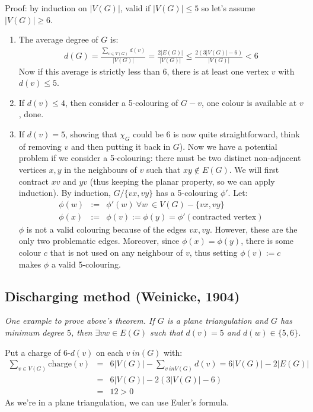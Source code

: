 		Proof: by induction on $|V(G)|$, valid if $|V(G)| \leq 5$ so let's assume $|V(G)| \geq 6$. 
		\begin{enumerate}
			\item The average degree of $G$ is:
				\begin{eqnarray}
					d(G) = \frac{\sum_{v \in V(G)} d(v)}{|V(G)|} = \frac{2 |E(G)|}{|V(G)|} \leq \frac{2 (3|V(G)| - 6)}{|V(G)|} < 6
				\end{eqnarray}
				Now if this average is strictly less than 6, there is at least one vertex $v$ with $d(v) \leq 5$.
			\item If $d(v) \leq 4$, then consider a 5-colouring of $G-v$, one colour is available at $v$, done.
			\item If $d(v) = 5$, showing that $\chi_{G}$ could be 6 is now quite straightforward, think of removing $v$ and then putting it back in $G$). Now we have a potential problem if we consider a 5-colouring: there must be two distinct non-adjacent vertices $x, y$ in the neighbours of $v$ such that $xy \notin E(G)$. We will first contract $xv$ and $yv$ (thus keeping the planar property, so we can apply induction). By induction, $G / \{ vx, vy \}$ has a 5-colouring $\phi'$. Let:
				\begin{eqnarray}
					\phi(w) &:=& \phi'(w) ~\forall w\ \in V(G) - \{ vx, vy \}\\
					\phi(x) &:=& \phi(v) := \phi(y) = \phi'(\text{contracted vertex})
				\end{eqnarray}
				$\phi$ is not a valid colouring because of the edges $vx, vy$. However, these are the only two problematic edges. Moreover, since $\phi(x) = \phi(y)$, there is some colour $c$ that is not used on any neighbour of $v$, thus setting $\phi(v) := c$ makes $\phi$ a valid 5-colouring.
		\end{enumerate}
		
		
		\subsection{Discharging method (Weinicke, 1904)}
		\textit{One example to prove above's theorem. If $G$ is a plane triangulation and $G$ has minimum degree $5$, then $\exists vw \in E(G)$ such that $d(v) = 5$ and $d(w) \in \{ 5, 6 \}$.\\}
		
		Put a charge of 6-$d(v)$ on each $v \ in (G)$ with:
		\begin{eqnarray}
			\sum_{v \in V(G)} \text{charge}(v) &=& 6 |V(G)| - \sum_{v \ in V(G)} d(v) = 6 |V(G)| - 2 |E(G)|\\
			&=& 6 |V(G)| - 2 (3|V(G)| - 6) \\
			&=& 12 > 0
		\end{eqnarray}
		As we're in a plane triangulation, we can use Euler's formula.\\
		
